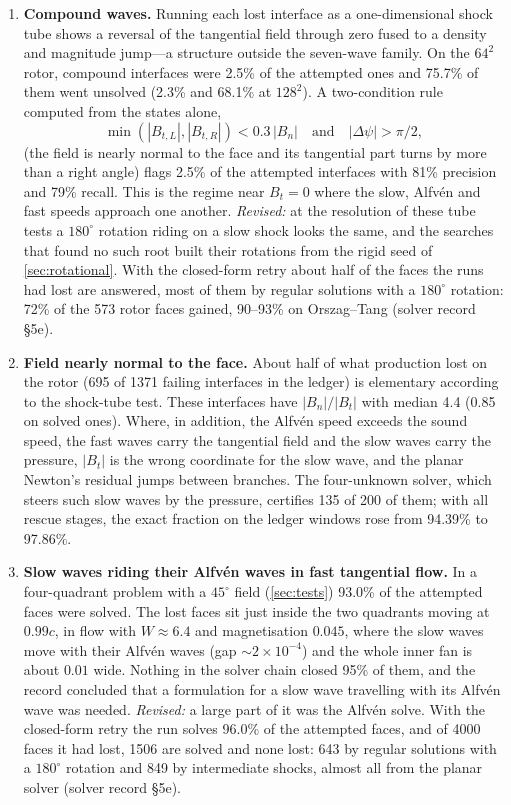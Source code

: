 \documentclass[11pt,a4paper,oneside,openany]{book}
\theoremstyle{definition}
\theoremstyle{plain}
\theoremstyle{remark}
\begin{document}
\begin{enumerate}
\item \textbf{Compound waves.} Running each lost interface as a one-dimensional shock tube
  shows a reversal of the tangential field through zero fused to a density and magnitude
  jump---a structure outside the seven-wave family. On the $64^2$ rotor, compound
  interfaces were 2.5\% of the attempted ones and 75.7\% of them went unsolved (2.3\% and
  68.1\% at $128^2$). A two-condition rule computed from the states alone,
  \begin{equation}
  \min(|B_{t,L}|,|B_{t,R}|)<0.3\,|B_n|\quad\text{and}\quad|\Delta\psi|>\pi/2,
  \end{equation}
  (the field is nearly normal to the face and its tangential part turns by more than a right
  angle) flags 2.5\% of the attempted interfaces with 81\% precision and 79\% recall. This
  is the regime near $B_t=0$ where the slow, Alfvén and fast speeds approach one another.
  \emph{Revised:} at the resolution of these tube tests a $180^\circ$ rotation riding on a
  slow shock looks the same, and the searches that found no such root built their rotations
  from the rigid seed of \cref{sec:rotational}. With the closed-form retry about half of the
  faces the runs had lost are answered, most of them by regular solutions with a
  $180^\circ$ rotation: 72\% of the 573 rotor faces gained, 90--93\% on Orszag--Tang
  (solver record \S5e).
\item \textbf{Field nearly normal to the face.} About half of what production lost on the
  rotor (695 of 1371 failing interfaces in the ledger) is elementary according to the
  shock-tube test. These interfaces have $|B_n|/|B_t|$ with median 4.4 (0.85 on solved
  ones). Where, in addition, the Alfvén speed exceeds the sound speed, the fast waves carry the
  tangential field and the slow waves carry the pressure, $|B_t|$ is the wrong coordinate for
  the slow wave, and the planar Newton's residual jumps between branches. The four-unknown
  solver, which steers such slow waves by the pressure, certifies 135 of 200 of them; with
  all rescue stages, the exact fraction on the ledger windows rose from 94.39\% to 97.86\%.
\item \textbf{Slow waves riding their Alfvén waves in fast tangential flow.} In a
  four-quadrant problem with a $45^\circ$ field (\cref{sec:tests}) 93.0\% of the attempted
  faces were solved. The lost faces sit just inside the two quadrants moving at $0.99c$,
  in flow with $W\approx6.4$ and magnetisation $0.045$, where the slow waves move with their
  Alfvén waves (gap $\sim2\times10^{-4}$) and the whole inner fan is about $0.01$ wide.
  Nothing in the solver chain closed 95\% of them, and the record concluded that a
  formulation for a slow wave travelling with its Alfvén wave was needed. \emph{Revised:} a
  large part of it was the Alfvén solve. With the closed-form retry the run solves 96.0\% of the
  attempted faces, and of 4000 faces it had lost, 1506 are solved and none lost: 643 by
  regular solutions with a $180^\circ$ rotation and 849 by intermediate shocks, almost all
  from the planar solver (solver record \S5e).
\end{enumerate}
\end{document}
